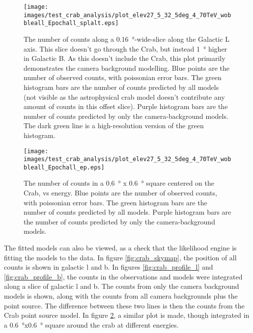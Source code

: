     \begin{figure}[h]
      \centering
      \texttt{[image: images/test\_crab\_analysis/plot\_elev27\_5\_32\_5deg\_4\_70TeV\_wobbleall\_Epochall\_splalt.eps]}
      \caption[Crab Profile along Galactic L Off Source]
      {
        The number of counts along a \SI{0.16}{\degree}-wide-slice along the Galactic L axis.
        This slice doesn't go through the Crab, but instead \SI{1}{\degree} higher in Galactic B.
        As this doesn't include the Crab, this plot primarily demonstrates the camera background modelling.
        Blue points are the number of observed counts, with poissonian error bars.
        The green histogram bars are the number of counts predicted by all models (not visible as the astrophysical crab model doesn't contribute any amount of counts in this offset slice).
        Purple histogram bars are the number of counts predicted by only the camera-background models.
        The dark green line is a high-resolution version of the green histogram.
      }
      \label{fig:crab_profile_l_off}
    \end{figure}

    \begin{figure}[h]
      \centering
      \texttt{[image: images/test\_crab\_analysis/plot\_elev27\_5\_32\_5deg\_4\_70TeV\_wobbleall\_Epochall\_ep.eps]}
      \caption[Crab Profile in Energy]
      {
        The number of counts in a \SI{0.6}{\degree} x \SI{0.6}{\degree} square centered on the Crab, vs energy.
        Blue points are the number of observed counts, with poissonian error bars.
        The green histogram bars are the number of counts predicted by all models.
        Purple histogram bars are the number of counts predicted by only the camera-background models.
      }
      \label{fig:crab_profile_energy}
    \end{figure}
    
    The fitted models can also be viewed, as a check that the likelihood engine is fitting the models to the data.
    In figure \ref{fig:crab_skymap}, the position of all counts is shown in galactic l and b.
    In figures \ref{fig:crab_profile_l} and \ref{fig:crab_profile_b}, the counts in the observations and models were integrated along a slice of galactic l and b.
    The counts from only the camera background models is shown, along with the counts from all camera backgrounds plus the point source.
    The difference between these two lines is then the counts from the Crab point source model.
    In figure \ref{fig:crab_profile_energy}, a similar plot is made, though integrated in a \SI{0.6}{\degree}x\SI{0.6}{\degree} square around the crab at different energies.

